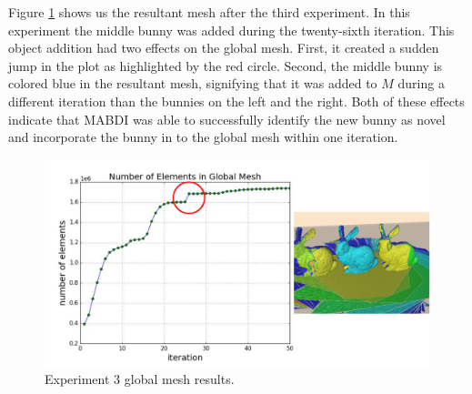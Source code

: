 Figure \ref{fig:gm_3} shows us the resultant mesh after the third experiment. In
this experiment the middle bunny was added during the twenty-sixth iteration.
This object addition had two effects on the global mesh. First, it created a
sudden jump in the plot as highlighted by the red circle. Second, the middle
bunny is colored blue in the resultant mesh, signifying that it was added to $M$
during a different iteration than the bunnies on the left and the right. Both of
these effects indicate that MABDI was able to successfully identify the new
bunny as novel and incorporate the bunny in to the global mesh within one
iteration.

\begin{figure}[h]%
\centering
  \includegraphics[width=\textwidth]{figures/results_run3_gm.pdf}
  \caption{Experiment 3 global mesh results.}
  \label{fig:gm_3}
\end{figure}

